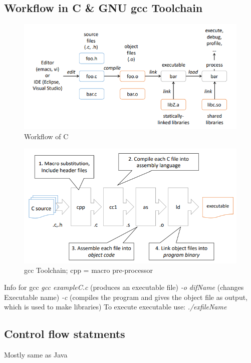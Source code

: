 \documentclass[a4paper,10pt]{article}
\begin{document}
\subsection{Workflow in C \& GNU gcc Toolchain}
\begin{figure}[htp]
    \centering
    \includegraphics[width=1\linewidth]{e4.png}
    \caption{Workflow of C}
    \label{fig:enter-label}
\end{figure}
\begin{figure}[htp]
    \centering
    \includegraphics[width=1\linewidth]{e5.png}
    \caption{gcc Toolchain; cpp = macro pre-processor}
    \label{fig:enter-label}
\end{figure}
\begin{tipbox}
    {Info for gcc}
    \textit{gcc exampleC.c} (produces an executable file)
    \textit{-o difName} (changes Executable name)
    \textit{-c } (compiles the program and gives the object file as output, which is used to make libraries)
    To execute executable use: \textit{./exfileName}
\end{tipbox}

\subsection{Control flow statments}
Mostly same as Java
\end{document}

